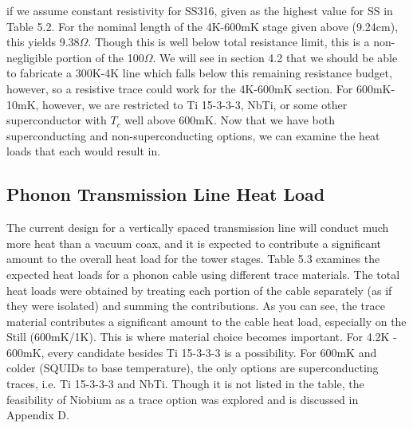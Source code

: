 \documentclass{report}
\begin{document}
if we assume constant resistivity for SS316, given as the highest value for SS in Table 5.2. For the nominal length of the 4K-600mK stage given above (9.24cm), this yields 9.38$\Omega$. Though this is well below total resistance limit, this is a non-negligible portion of the 100$\Omega$. We will see in section 4.2 that we should be able to fabricate a 300K-4K line which falls below this remaining resistance budget, however, so a resistive trace could work for the 4K-600mK section. For 600mK-10mK, however, we are restricted to Ti 15-3-3-3, NbTi, or some other superconductor with $T_c$ well above 600mK. Now that we have both superconducting and non-superconducting options, we can examine the heat loads that each would result in.

\subsection{Phonon Transmission Line Heat Load}

The current design for a vertically spaced transmission line will conduct much more heat than a vacuum coax, and it is expected to contribute a significant amount to the overall heat load for the tower stages. Table 5.3 examines the expected heat loads for a phonon cable using different trace materials\footnotemark. The total heat loads were obtained by treating each portion of the cable separately (as if they were isolated) and summing the contributions. As you can see, the trace material contributes a significant amount to the cable heat load, especially on the Still (600mK/1K). This is where material choice becomes important. For 4.2K - 600mK, every candidate besides Ti 15-3-3-3 is a possibility. For 600mK and colder (SQUIDs to base temperature), the only options are superconducting traces, i.e. Ti 15-3-3-3 and NbTi. Though it is not listed in the table, the feasibility of Niobium as a trace option was explored and is discussed in Appendix D.
\end{document}
